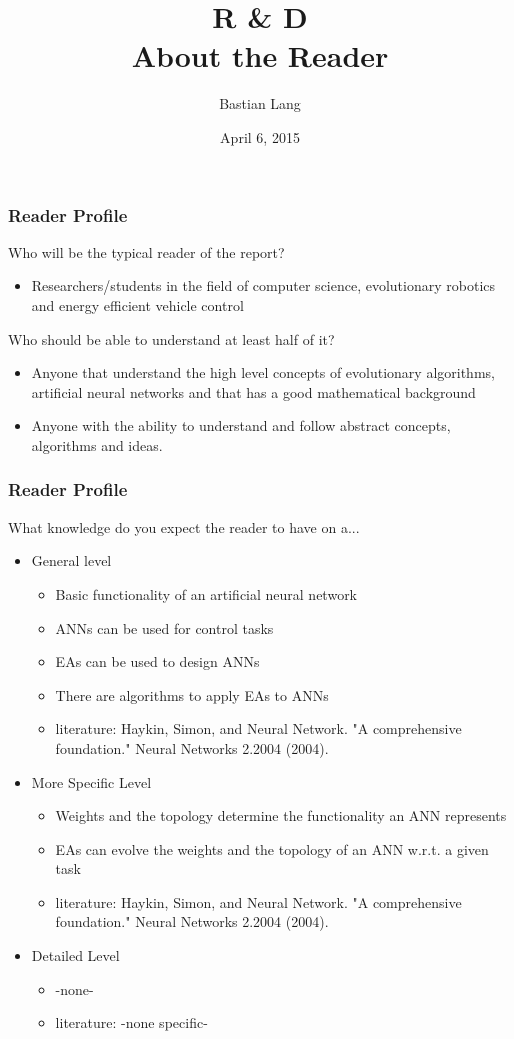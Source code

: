 \documentclass[8pt]{beamer}
\title[R \& D]{R \& D\\About the Reader} %
\author{Bastian Lang} %
\institute[BRSU] %
{
Master of Autonomous Systems \\ %
}
\date{April 6, 2015}
\begin{document}
\listoffigures
\begin{frame}
\titlepage 
\end{frame}


\begin{frame}
	\frametitle{Reader Profile}
	Who will be the typical reader of the report?
	\begin{itemize}
		\item Researchers/students in the field of computer science, evolutionary robotics and energy efficient vehicle control
	\end{itemize}
	Who should be able to understand at least half of it?
	\begin{itemize}
		\item Anyone that understand the high level concepts of evolutionary algorithms, artificial neural networks and that has a good mathematical background
		\item Anyone with the ability to understand and follow abstract concepts, algorithms and ideas.
	\end{itemize}
\end{frame}

\begin{frame}
	\frametitle{Reader Profile}
	What knowledge do you expect the reader to have on a...
	\begin{itemize}
		\item General level
		\begin{itemize}
			\item Basic functionality of an artificial neural network
			\item ANNs can be used for control tasks
			\item EAs can be used to design ANNs
			\item There are algorithms to apply EAs to ANNs
			\item literature: Haykin, Simon, and Neural Network. "A comprehensive foundation." Neural Networks 2.2004 (2004).
		\end{itemize}
		
		\item More Specific Level
		\begin{itemize}
			\item Weights and the topology determine the functionality an ANN represents
			\item EAs can evolve the weights and the topology of an ANN w.r.t. a given task
			\item literature: Haykin, Simon, and Neural Network. "A comprehensive foundation." Neural Networks 2.2004 (2004).
		\end{itemize}
		\item Detailed Level
		\begin{itemize}
			\item -none-
			\item literature: -none specific-
		\end{itemize}
	\end{itemize}
\end{frame}
\end{document}
